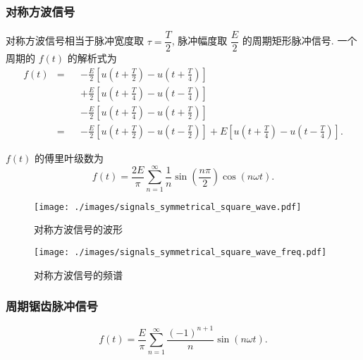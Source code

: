 \subsubsection{对称方波信号}
对称方波信号相当于脉冲宽度取 $\tau=\dfrac{T}{2}$, 脉冲幅度取 $\dfrac{E}{2}$ 的周期矩形脉冲信号. 一个周期的 $f(t)$ 的解析式为
\begin{equation}
    \begin{alignedat}{2}
        f(t) & = &  & -\frac{E}{2}\left[u\left(t+\frac{T}{2}\right)-u\left(t+\frac{T}{4}\right)\right]                                                                        \\
        &   &  & +\frac{E}{2}\left[u\left(t+\frac{T}{4}\right)-u\left(t-\frac{T}{4}\right)\right]                                                                        \\
        &   &  & -\frac{E}{2}\left[u\left(t+\frac{T}{4}\right)-u\left(t+\frac{T}{2}\right)\right]                                                                        \\
        & = &  & -\frac{E}{2}\left[u\left(t+\frac{T}{2}\right)-u\left(t-\frac{T}{2}\right)\right]+E\left[u\left(t+\frac{T}{4}\right)-u\left(t-\frac{T}{4}\right)\right].
    \end{alignedat}
\end{equation}

$f(t)$ 的傅里叶级数为
\begin{equation}
    f(t)=\frac{2E}{\pi}\sum_{n=1}^{\infty}\frac{1}{n}\sin\left(\frac{n\pi}{2}\right)\cos(n\omega t).
\end{equation}

\begin{figure}[H]
    \centering
    \begin{minipage}{.448\textwidth}
        \centering
        \texttt{[image: ./images/signals\_symmetrical\_square\_wave.pdf]}
        \caption{对称方波信号的波形}
    \end{minipage}
    \begin{minipage}{.532\textwidth}
        \centering
        \texttt{[image: ./images/signals\_symmetrical\_square\_wave\_freq.pdf]}
        \caption{对称方波信号的频谱}
    \end{minipage}
\end{figure}

\subsubsection{周期锯齿脉冲信号}
\srmg
\begin{equation}
    f(t)=\frac{E}{\pi}\sum_{n=1}^{\infty}\frac{(-1)^{n+1}}{n}\sin(n\omega t).
\end{equation}

